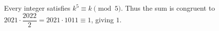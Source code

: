 Every integer satisfies $k^5\equiv k\pmod5$. Thus the sum is congruent to $2021\cdot\dfrac{2022}{2}=2021\cdot1011\equiv1$, giving $\boxed1$.
